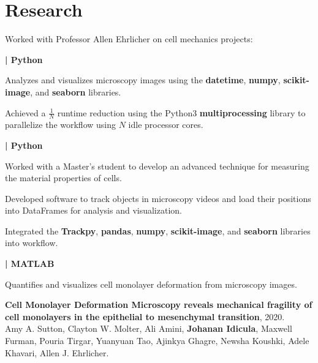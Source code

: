 \documentclass[]{jidicula-resume}
\begin{document}
\section{Research}
Worked with Professor Allen Ehrlicher on cell mechanics projects:

\textbf{| Python}
\begin{tightemize}
\item Analyzes and visualizes microscopy images using the \textbf{datetime},
  \textbf{numpy}, \textbf{scikit-image}, and \textbf{seaborn} libraries.
\item Achieved a $\frac{1}{N}$ runtime reduction using the Python3 \textbf{multiprocessing} library to parallelize the workflow using $N$ idle processor cores.
\end{tightemize}
\sectionsep
{}
\textbf{| Python}
\begin{tightemize}
  
\item Worked with a Master's student to develop an advanced technique for measuring the material properties of cells.

\item Developed software to track objects in microscopy videos and load their
  positions into DataFrames for analysis and visualization.
\item Integrated the \textbf{Trackpy}, \textbf{pandas}, \textbf{numpy},
  \textbf{scikit-image}, and \textbf{seaborn} libraries into workflow.
\end{tightemize}
\sectionsep
{}
\textbf{| MATLAB}
\begin{tightemize}
\item Quantifies and visualizes cell monolayer deformation from microscopy
  images.
\item \textbf{Cell Monolayer Deformation Microscopy reveals mechanical fragility of cell monolayers in the epithelial to mesenchymal transition}, 2020.\\
  Amy A. Sutton, Clayton W. Molter, Ali Amini, \textbf{Johanan Idicula},
  Maxwell Furman, Pouria Tirgar, Yuanyuan Tao, Ajinkya Ghagre, Newsha Koushki, Adele Khavari, Allen J. Ehrlicher.

\end{tightemize}
\sectionsep
\end{document}
